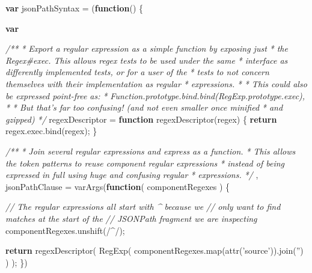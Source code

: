 \documentclass[12pt, ]{article}
\newenvironment{Shaded}{}{}
\newcommand{\KeywordTok}[1]{\textcolor[rgb]{0.00,0.44,0.13}{\textbf{{#1}}}}
\newcommand{\FloatTok}[1]{\textcolor[rgb]{0.25,0.63,0.44}{{#1}}}
\newcommand{\StringTok}[1]{\textcolor[rgb]{0.25,0.44,0.63}{{#1}}}
\newcommand{\CommentTok}[1]{\textcolor[rgb]{0.38,0.63,0.69}{\textit{{#1}}}}
\newcommand{\OtherTok}[1]{\textcolor[rgb]{0.00,0.44,0.13}{{#1}}}
\newcommand{\FunctionTok}[1]{\textcolor[rgb]{0.02,0.16,0.49}{{#1}}}
\newcommand{\NormalTok}[1]{{#1}}
\begin{document}
\begin{Shaded}
\begin{Highlighting}[]
\KeywordTok{var} \NormalTok{jsonPathSyntax = (}\KeywordTok{function}\NormalTok{() \{}
 
   \KeywordTok{var}
   
   \CommentTok{/** }
\CommentTok{    * Export a regular expression as a simple function by exposing just }
\CommentTok{    * the Regex#exec. This allows regex tests to be used under the same }
\CommentTok{    * interface as differently implemented tests, or for a user of the}
\CommentTok{    * tests to not concern themselves with their implementation as regular}
\CommentTok{    * expressions.}
\CommentTok{    * }
\CommentTok{    * This could also be expressed point-free as:}
\CommentTok{    *   Function.prototype.bind.bind(RegExp.prototype.exec),}
\CommentTok{    *   }
\CommentTok{    * But that's far too confusing! (and not even smaller once minified }
\CommentTok{    * and gzipped)}
\CommentTok{    */}
       \NormalTok{regexDescriptor = }\KeywordTok{function} \FunctionTok{regexDescriptor}\NormalTok{(regex) \{}
            \KeywordTok{return} \OtherTok{regex}\NormalTok{.}\OtherTok{exec}\NormalTok{.}\FunctionTok{bind}\NormalTok{(regex);}
       \NormalTok{\}}
       
   \CommentTok{/**}
\CommentTok{    * Join several regular expressions and express as a function.}
\CommentTok{    * This allows the token patterns to reuse component regular expressions}
\CommentTok{    * instead of being expressed in full using huge and confusing regular}
\CommentTok{    * expressions.}
\CommentTok{    */}       
   \NormalTok{,   jsonPathClause = }\FunctionTok{varArgs}\NormalTok{(}\KeywordTok{function}\NormalTok{( componentRegexes ) \{}

            \CommentTok{// The regular expressions all start with ^ because we }
            \CommentTok{// only want to find matches at the start of the }
            \CommentTok{// JSONPath fragment we are inspecting           }
            \OtherTok{componentRegexes}\NormalTok{.}\FunctionTok{unshift}\NormalTok{(}\OtherTok{/}\FloatTok{^}\OtherTok{/}\NormalTok{);}
            
            \KeywordTok{return}   \FunctionTok{regexDescriptor}\NormalTok{(}
                        \FunctionTok{RegExp}\NormalTok{(}
                           \OtherTok{componentRegexes}\NormalTok{.}\FunctionTok{map}\NormalTok{(}\FunctionTok{attr}\NormalTok{(}\StringTok{'source'}\NormalTok{)).}\FunctionTok{join}\NormalTok{(}\StringTok{''}\NormalTok{)}
                        \NormalTok{)}
                     \NormalTok{);}
       \NormalTok{\})}
       

\end{Highlighting}
\end{Shaded}
\end{document}
